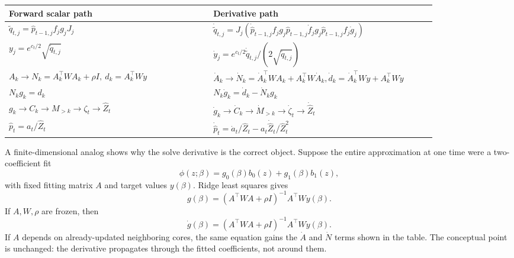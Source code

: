 \documentclass[11pt]{article}
\numberwithin{equation}{section}
\begin{document}
\begin{center}
\begin{tabular}{p{0.42\linewidth}p{0.42\linewidth}}
\toprule
Forward scalar path & Derivative path\\
\midrule
\(\widetilde q_{t,j}
=\widehat p_{t-1,j} f_j g_jJ_j\) &
\(\dot{\widetilde q}_{t,j}
=J_j(\dot{\widehat p}_{t-1,j}f_jg_j
\widehat p_{t-1,j}\dot f_jg_j
\widehat p_{t-1,j}f_j\dot g_j)\)\\
\(y_j=e^{c_t/2}\sqrt{\widetilde q_{t,j}}\) &
\(\dot y_j=e^{c_t/2}\dot{\widetilde q}_{t,j}/(2\sqrt{\widetilde q_{t,j}})\)\\
\(A_k\to N_k=A_k^\top W A_k+\rho I,\ d_k=A_k^\top Wy\) &
\(\dot A_k\to \dot N_k=\dot A_k^\top WA_k+A_k^\top W\dot A_k,
\dot d_k=\dot A_k^\top Wy+A_k^\top W\dot y\)\\
\(N_kg_k=d_k\) &
\(N_k\dot g_k=\dot d_k-\dot N_kg_k\)\\
\(g_k\to C_k\to M_{>k}\to\zeta_t\to\widehat Z_t\) &
\(\dot g_k\to\dot C_k\to\dot M_{>k}\to\dot\zeta_t\to\dot{\widehat Z}_t\)\\
\(\widehat p_t=a_t/\widehat Z_t\) &
\(\dot{\widehat p}_t=\dot a_t/\widehat Z_t-a_t\dot{\widehat Z}_t/\widehat Z_t^2\)\\
\bottomrule
\end{tabular}
\end{center}

A finite-dimensional analog shows why the solve derivative is the correct
object.  Suppose the entire approximation at one time were a two-coefficient
fit
\begin{equation}
    \phi(z;\beta)=g_0(\beta)b_0(z)+g_1(\beta)b_1(z),
    \label{eq:p25-gradteach-7}
\end{equation}
with fixed fitting matrix \(A\) and target values \(y(\beta)\).  Ridge least
squares gives
\begin{equation}
    g(\beta)
    =
    (A^\top W A+\rho I)^{-1}A^\top W y(\beta).
    \label{eq:p25-gradteach-8}
\end{equation}
If \(A,W,\rho\) are frozen, then
\begin{equation}
    \dot g(\beta)
    =
    (A^\top W A+\rho I)^{-1}A^\top W\dot y(\beta).
    \label{eq:p25-gradteach-9}
\end{equation}
If \(A\) depends on already-updated neighboring cores, the same equation gains
the \(\dot A\) and \(\dot N\) terms shown in the table.  The conceptual point is
unchanged: the derivative propagates through the fitted coefficients, not
around them.
\end{document}
